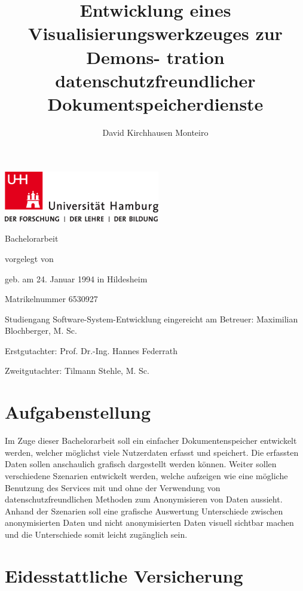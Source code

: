 \documentclass[
    fontsize=12pt,
    headings=small,
    parskip=half,           %
    bibliography=totoc,
    numbers=noenddot,       %
    open=any,               %
    ]{scrreprt}
\title{Entwicklung eines Visualisierungswerkzeuges zur Demons-
tration datenschutzfreundlicher Dokumentspeicherdienste}
\author{David Kirchhausen Monteiro}
\begin{document}
\begin{titlepage}%
\includegraphics[width=6.8cm]{../pic/up-uhh-logo-u-2010-u-farbe-u-rgb.pdf}
\begin{center}\Large
	\vfill
	Bachelorarbeit
	\vfill
	\makeatletter
	{\Large\textsf{\textbf{\@title}}\par}
	\makeatother
	\vfill
	vorgelegt von
	\par\bigskip
	\makeatletter
	{\@author} \par
	\makeatother
	geb. am 24. Januar 1994 in Hildesheim \par
	Matrikelnummer 6530927 \par
	Studiengang Software-System-Entwicklung
	\vfill
	\makeatletter
	eingereicht am {\@date}
	\makeatother
	\vfill
	Betreuer: Maximilian Blochberger, M. Sc. \par
	Erstgutachter: Prof. Dr.-Ing. Hannes Federrath \par
	Zweitgutachter: Tilmann Stehle, M. Sc.
\end{center}
\ifoptionfinal{}{}
\end{titlepage}%

\chapter*{Aufgabenstellung}
Im  Zuge  dieser  Bachelorarbeit  soll  ein  einfacher  Dokumentenspeicher  entwickelt  werden,
welcher möglichst viele Nutzerdaten erfasst und speichert. Die erfassten Daten sollen anschaulich
grafisch dargestellt werden können. Weiter sollen verschiedene Szenarien entwickelt werden,
welche aufzeigen wie eine mögliche Benutzung des Services mit und ohne der Verwendung
von datenschutzfreundlichen Methoden zum Anonymisieren von Daten aussieht. Anhand der
Szenarien soll eine grafische Auswertung Unterschiede zwischen anonymisierten Daten und
nicht anonymisierten Daten visuell sichtbar machen und die Unterschiede somit leicht zugänglich
sein.

\chapter*{Eidesstattliche Versicherung} %
\vspace{1cm}
\end{document}
